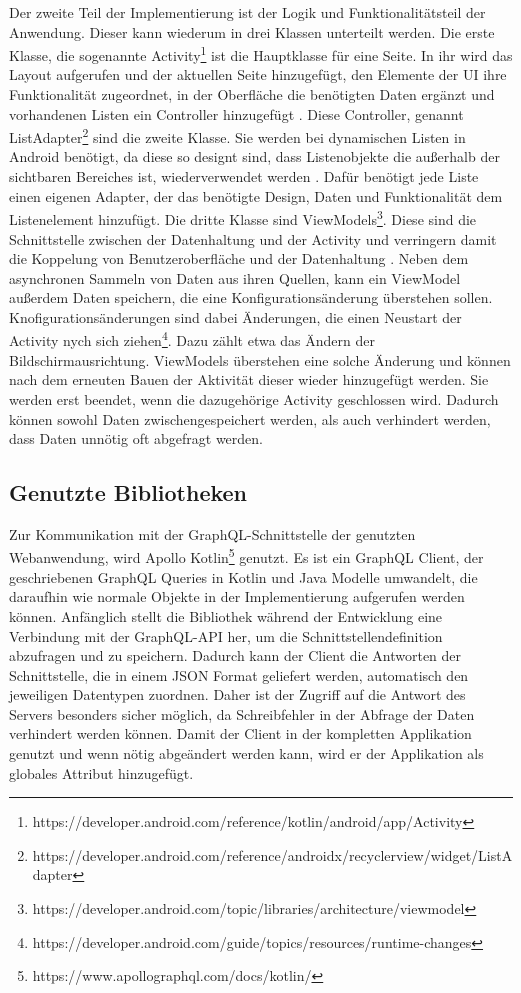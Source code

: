 Der zweite Teil der Implementierung ist der Logik und Funktionalitätsteil der Anwendung. Dieser kann wiederum in drei Klassen unterteilt werden. 
Die erste Klasse, die sogenannte Activity\footnote{https://developer.android.com/reference/kotlin/android/app/Activity} ist die Hauptklasse für eine Seite. In ihr wird das Layout aufgerufen und der aktuellen Seite hinzugefügt, den Elemente der UI ihre Funktionalität zugeordnet, in der Oberfläche die benötigten Daten ergänzt und vorhandenen Listen ein Controller hinzugefügt \cite{sarkar_android}.
Diese Controller, genannt ListAdapter\footnote{https://developer.android.com/reference/androidx/recyclerview/widget/ListAdapter} sind die zweite Klasse. Sie werden bei dynamischen Listen in Android benötigt, da diese so designt sind, dass Listenobjekte die außerhalb der sichtbaren Bereiches ist, wiederverwendet werden \cite{recyclerview_android}. Dafür benötigt jede Liste einen eigenen Adapter, der das benötigte Design, Daten und Funktionalität dem Listenelement hinzufügt.
Die dritte Klasse sind ViewModels\footnote{https://developer.android.com/topic/libraries/architecture/viewmodel}. Diese sind die Schnittstelle zwischen der Datenhaltung und der Activity und verringern damit die Koppelung von Benutzeroberfläche und der Datenhaltung \cite{viewModel_android}. Neben dem asynchronen Sammeln von Daten aus ihren Quellen, kann ein ViewModel außerdem Daten speichern, die eine Konfigurationsänderung überstehen sollen. Knofigurationsänderungen sind dabei Änderungen, die einen Neustart der Activity nych sich ziehen\footnote{https://developer.android.com/guide/topics/resources/runtime-changes}. Dazu zählt etwa das Ändern der Bildschirmausrichtung. ViewModels überstehen eine solche Änderung und können nach dem erneuten Bauen der Aktivität dieser wieder hinzugefügt werden. Sie werden erst beendet, wenn die dazugehörige Activity geschlossen wird. Dadurch können sowohl Daten zwischengespeichert werden, als auch verhindert werden, dass Daten unnötig oft abgefragt werden.


\subsection{Genutzte Bibliotheken}
Zur Kommunikation mit der GraphQL-Schnittstelle der genutzten Webanwendung, wird Apollo Kotlin\footnote{https://www.apollographql.com/docs/kotlin/} genutzt. 
Es ist ein GraphQL Client, der geschriebenen GraphQL Queries in Kotlin und Java Modelle umwandelt, die daraufhin wie normale Objekte in der Implementierung aufgerufen werden können.
Anfänglich stellt die Bibliothek während der Entwicklung eine Verbindung mit der GraphQL-API her, um die Schnittstellendefinition abzufragen und zu speichern. Dadurch kann der Client die Antworten der Schnittstelle, die in einem JSON Format geliefert werden, automatisch den jeweiligen Datentypen zuordnen. Daher ist der Zugriff auf die Antwort des Servers besonders sicher möglich, da Schreibfehler in der Abfrage der Daten verhindert werden können.
Damit der Client in der kompletten Applikation genutzt und wenn nötig abgeändert werden kann, wird er der Applikation als globales Attribut hinzugefügt.

